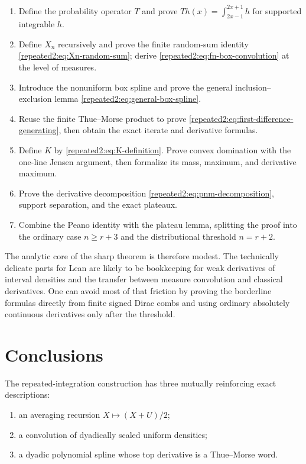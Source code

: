 \documentclass[11pt,oneside]{article}
\theoremstyle{definition}
\theoremstyle{remark}
\begin{document}
\begin{enumerate}[label=\textup{(\arabic*)}]
\item Define the probability operator $T$ and prove
$Th(x)=\int_{2x-1}^{2x+1}h$ for supported integrable $h$.
\item Define $X_n$ recursively and prove the finite random-sum identity
\eqref{repeated2:eq:Xn-random-sum}; derive \eqref{repeated2:eq:fn-box-convolution} at the level of measures.
\item Introduce the nonuniform box spline and prove the general inclusion--exclusion lemma
\eqref{repeated2:eq:general-box-spline}.
\item Reuse the finite Thue--Morse product to prove
\eqref{repeated2:eq:first-difference-generating}, then obtain the exact iterate and derivative formulas.
\item Define $K$ by \eqref{repeated2:eq:K-definition}.  Prove convex domination with the one-line
Jensen argument, then formalize its mass, maximum, and derivative maximum.
\item Prove the derivative decomposition \eqref{repeated2:eq:pnm-decomposition}, support separation,
and the exact plateaux.
\item Combine the Peano identity with the plateau lemma, splitting the proof into the
ordinary case $n\ge r+3$ and the distributional threshold $n=r+2$.
\end{enumerate}

The analytic core of the sharp theorem is therefore modest.  The technically delicate
parts for Lean are likely to be bookkeeping for weak derivatives of interval densities and
the transfer between measure convolution and classical derivatives.  One can avoid most
of that friction by proving the borderline formulas directly from finite signed Dirac
combs and using ordinary absolutely continuous derivatives only after the threshold.

\section{Conclusions}
\label{repeated2:sec:conclusion}

The repeated-integration construction has three mutually reinforcing exact descriptions:

\begin{enumerate}[label=\textup{(\roman*)}]
\item an averaging recursion $X\mapsto(X+U)/2$;
\item a convolution of dyadically scaled uniform densities;
\item a dyadic polynomial spline whose top derivative is a Thue--Morse word.
\end{enumerate}
\end{document}
